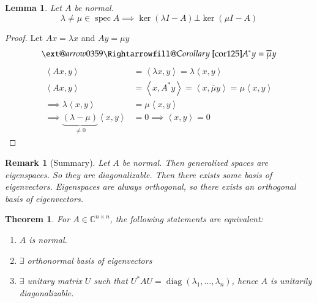 \documentclass[a4paper]{article}
\makeatletter
\newcounter{lecref}[section]
\numberwithin{lecref}{section}
\newtheorem{theorem}[lecref]{Theorem}
\newtheorem{lemma}[lecref]{Lemma}
\newtheorem*{Remark}{Remark}
\newcommand{\angel}[1]{\left\langle#1\right\rangle}
\newcommand{\xRightarrow}[2][]{\ext@arrow 0359\Rightarrowfill@{#1}{#2}}
\makeatother
\begin{document}
\begin{lemma} %
  Let $A$ be normal.
  \[ \lambda \neq \mu \in \operatorname{spec}{A} \implies \ker(\lambda I - A) \bot \ker(\mu I - A) \]
\end{lemma}

\begin{proof}
  Let $Ax = \lambda x$ and $Ay = \mu y$
  \[ \xRightarrow{Corollary~\ref{cor125}} A^* y = \overline{\mu} y \]
  \begin{align*}
    \angel{Ax,y} &= \angel{\lambda x, y} = \lambda \angel{x,y} \\
    \angel{Ax,y} &= \angel{x, A^* y} = \angel{x, \overline{\mu} y} = \mu \angel{x,y} \\
    \implies \lambda \angel{x,y} &= \mu \angel{x,y} \\
    \implies \underbrace{(\lambda - \mu)}_{\neq 0} \angel{x,y} &= 0 \implies \angel{x,y} = 0
  \end{align*}
\end{proof}

\begin{Remark}[Summary]
  Let $A$ be normal. Then generalized spaces are eigenspaces.
  So they are diagonalizable. Then there exists some basis of eigenvectors.
  Eigenspaces are always orthogonal, so there exists an orthogonal basis of eigenvectors.
\end{Remark}

\begin{theorem} %
  For $A \in \mathbb C^{n \times n}$, the following statements are equivalent:
  \begin{enumerate}
    \item $A$ is normal.
    \item $\exists$ orthonormal basis of eigenvectors
    \item $\exists$ unitary matrix $U$ such that $U^* AU = \operatorname{diag}(\lambda_1, \dots, \lambda_n)$,
      hence $A$ is unitarily diagonalizable.
  \end{enumerate}
\end{theorem}
\end{document}

